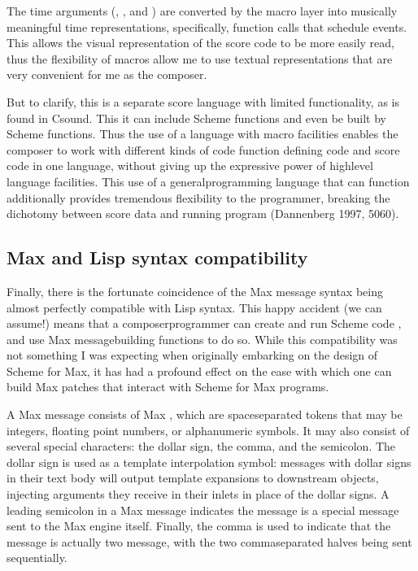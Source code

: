 \documentclass[letterpaper,10pt,english]{sphinxmanual}
\begin{document}
\sphinxAtStartPar
The time arguments (, , and ) are converted by the macro layer into musically meaningful time
representations, specifically, function calls that schedule events.
This allows the visual representation of the score code to be more easily read, thus
the flexibility of macros allow me to use textual representations that are very convenient for me as the composer.

\sphinxAtStartPar
But to clarify, this is  a separate score language with limited functionality, as is found in Csound.
This  \sphinxhyphen{} it can include  Scheme functions and even be built by Scheme functions.
Thus the use of a language with macro facilities enables the composer to work with different kinds of code
\sphinxhyphen{} function defining code and score code \sphinxhyphen{} in one language, without giving up the expressive power of high\sphinxhyphen{}level language
facilities. This use of a general\sphinxhyphen{}programming language that can function additionally 
provides tremendous flexibility to the programmer, breaking the dichotomy between score data and running program  (Dannenberg 1997, 50\sphinxhyphen{}60).


\subsection{Max and Lisp syntax compatibility}
\label{\detokenize{design:max-and-lisp-syntax-compatibility}}
\sphinxAtStartPar
Finally, there is the fortunate coincidence of the Max message syntax being almost perfectly compatible with Lisp syntax.
This happy accident (we can assume!) means that a composer\sphinxhyphen{}programmer can create and run Scheme code , and
use Max message\sphinxhyphen{}building functions to do so.
While this compatibility was not something I was expecting when originally embarking on the design of Scheme for Max,
it has had a profound effect on the ease with which one can build Max patches that interact with Scheme for Max programs.

\sphinxAtStartPar
A Max message consists of Max , which are space\sphinxhyphen{}separated tokens that may be integers, floating point numbers, or alpha\sphinxhyphen{}numeric symbols.
It may also consist of several special characters: the dollar sign, the comma, and the semi\sphinxhyphen{}colon.
The dollar sign is used as a template interpolation symbol: messages with dollar signs in their text body will output template
expansions to downstream objects, injecting arguments they receive in their inlets in place of the dollar signs.
A leading semi\sphinxhyphen{}colon in a Max message indicates the message is a special message sent to the Max engine itself.
Finally, the comma is used to indicate that the message is actually two message, with the two comma\sphinxhyphen{}separated halves being sent sequentially.
\end{document}
